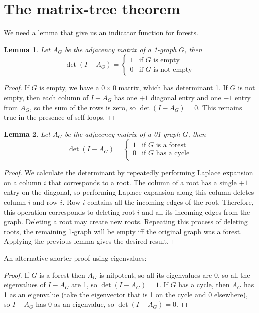 \documentclass[a4paper, 11pt]{article}
\newtheorem{lemma}{Lemma}[section]
\theoremstyle{definition}
\begin{document}
\section{The matrix-tree theorem}

We need a lemma that give us an indicator function for forests.

\begin{lemma}
  Let $A_G$ be the adjacency matrix of a 1-graph $G$, then
  \[
    \det(I - A_G) = \begin{cases}
      1 & \text{if $G$ is empty} \\
      0 & \text{if $G$ is not empty}
    \end{cases}
  \]
\end{lemma}
\begin{proof}
  If $G$ is empty, we have a $0\times 0$ matrix, which has determinant 1.
  If $G$ is not empty, then each column of $I - A_G$ has one $+1$ diagonal entry and one $-1$ entry from $A_G$, so the sum of the rows is zero, so $\det(I - A_G) = 0$. This remains true in the presence of self loops.
\end{proof}

\begin{lemma}
  \label{lem:indicator}
  Let $A_G$ be the adjacency matrix of a 01-graph $G$, then
  \[
    \det(I-A_G) = \begin{cases}
      1 & \text{if $G$ is a forest}\\
      0 & \text{if $G$ has a cycle}
    \end{cases}
  \]
\end{lemma}
\begin{proof}
We calculate the determinant by repeatedly performing Laplace expansion on a column $i$ that corresponds to a root. The column of a root has a single $+1$ entry on the diagonal, so performing Laplace expansion along this column deletes column $i$ and row $i$. Row $i$ contains all the incoming edges of the root. Therefore, this operation corresponds to deleting root $i$ and all its incoming edges from the graph. Deleting a root may create new roots. Repeating this process of deleting roots, the remaining 1-graph will be empty iff the original graph was a forest. Applying the previous lemma gives the desired result.
\end{proof}

An alternative shorter proof using eigenvalues:

\begin{proof}
  If $G$ is a forest then $A_G$ is nilpotent, so all its eigenvalues are $0$, so all the eigenvalues of $I - A_G$ are 1, so $\det(I - A_G) = 1$.
  If $G$ has a cycle, then $A_G$ has 1 as an eigenvalue (take the eigenvector that is 1 on the cycle and 0 elsewhere), so $I - A_G$ has 0 as an eigenvalue, so $\det(I - A_G) = 0$.
\end{proof}
\end{document}
